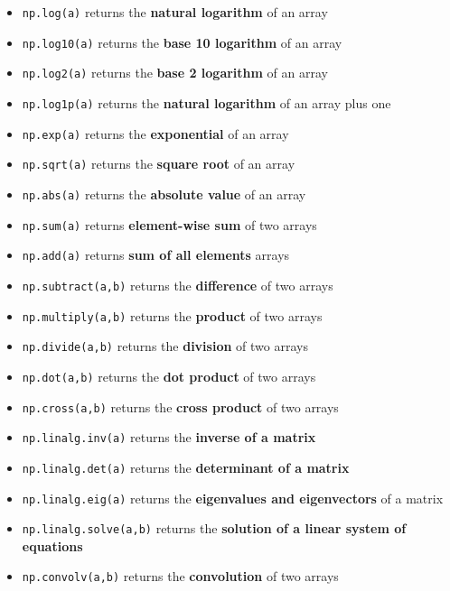 \documentclass[
  letterpaper,
  DIV=11,
  numbers=noendperiod]{scrreprt}
\providecommand{\tightlist}{%
  \setlength{\itemsep}{0pt}\setlength{\parskip}{0pt}}\usepackage{longtable,booktabs,array}
\begin{document}
\begin{itemize}
\tightlist
\item
  \texttt{np.log(a)} returns the \textbf{natural logarithm} of an array
\item
  \texttt{np.log10(a)} returns the \textbf{base 10 logarithm} of an
  array
\item
  \texttt{np.log2(a)} returns the \textbf{base 2 logarithm} of an array
\item
  \texttt{np.log1p(a)} returns the \textbf{natural logarithm} of an
  array plus one
\item
  \texttt{np.exp(a)} returns the \textbf{exponential} of an array
\item
  \texttt{np.sqrt(a)} returns the \textbf{square root} of an array
\item
  \texttt{np.abs(a)} returns the \textbf{absolute value} of an array
\item
  \texttt{np.sum(a)} returns \textbf{element-wise sum} of two arrays
\item
  \texttt{np.add(a)} returns \textbf{sum of all elements} arrays
\item
  \texttt{np.subtract(a,b)} returns the \textbf{difference} of two
  arrays
\item
  \texttt{np.multiply(a,b)} returns the \textbf{product} of two arrays
\item
  \texttt{np.divide(a,b)} returns the \textbf{division} of two arrays
\item
  \texttt{np.dot(a,b)} returns the \textbf{dot product} of two arrays
\item
  \texttt{np.cross(a,b)} returns the \textbf{cross product} of two
  arrays
\item
  \texttt{np.linalg.inv(a)} returns the \textbf{inverse of a matrix}
\item
  \texttt{np.linalg.det(a)} returns the \textbf{determinant of a matrix}
\item
  \texttt{np.linalg.eig(a)} returns the \textbf{eigenvalues and
  eigenvectors} of a matrix
\item
  \texttt{np.linalg.solve(a,b)} returns the \textbf{solution of a linear
  system of equations}
\item
  \texttt{np.convolv(a,b)} returns the \textbf{convolution} of two
  arrays
\end{itemize}
\end{document}

